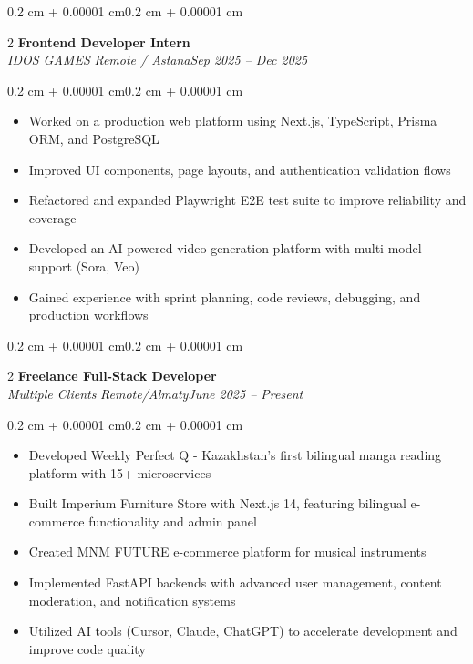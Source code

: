 \documentclass[10pt, letterpaper]{article}
\newenvironment{highlights}{\begin{itemize}[topsep=0.10 cm,parsep=0.10 cm,partopsep=0pt,itemsep=0pt,leftmargin=0.4 cm + 10pt]}{\end{itemize}}
\newenvironment{onecolentry}{\begin{adjustwidth}{0.2 cm + 0.00001 cm}{0.2 cm + 0.00001 cm}}{\end{adjustwidth}}
\newenvironment{twocolentry}[2][]{\onecolentry\def\secondColumn{#2}\setcolumnwidth{\fill, 4.5 cm}\begin{paracol}{2}}{\switchcolumn \raggedleft \secondColumn\end{paracol}\endonecolentry}
\begin{document}
\vspace{0.2 cm}
\begin{twocolentry}{\textit{Remote / Astana}\newline\textit{Sep 2025 – Dec 2025}}
\textbf{Frontend Developer Intern}\\
\textit{IDOS GAMES}
\end{twocolentry}
\vspace{0.10 cm}
\begin{onecolentry}
\begin{highlights}
    \item Worked on a production web platform using Next.js, TypeScript, Prisma ORM, and PostgreSQL
    \item Improved UI components, page layouts, and authentication validation flows
    \item Refactored and expanded Playwright E2E test suite to improve reliability and coverage
    \item Developed an AI-powered video generation platform with multi-model support (Sora, Veo)
    \item Gained experience with sprint planning, code reviews, debugging, and production workflows
\end{highlights}
\end{onecolentry}


\vspace{0.2 cm}
\begin{twocolentry}{\textit{Remote/Almaty}\newline\textit{June 2025 – Present}}
\textbf{Freelance Full-Stack Developer}\\
\textit{Multiple Clients}
\end{twocolentry}
\vspace{0.10 cm}
\begin{onecolentry}
\begin{highlights}
    \item Developed Weekly Perfect Q - Kazakhstan's first bilingual manga reading platform with 15+ microservices
    \item Built Imperium Furniture Store with Next.js 14, featuring bilingual e-commerce functionality and admin panel
    \item Created MNM FUTURE e-commerce platform for musical instruments
    \item Implemented FastAPI backends with advanced user management, content moderation, and notification systems
    \item Utilized AI tools (Cursor, Claude, ChatGPT) to accelerate development and improve code quality
\end{highlights}
\end{onecolentry}
\end{document}

